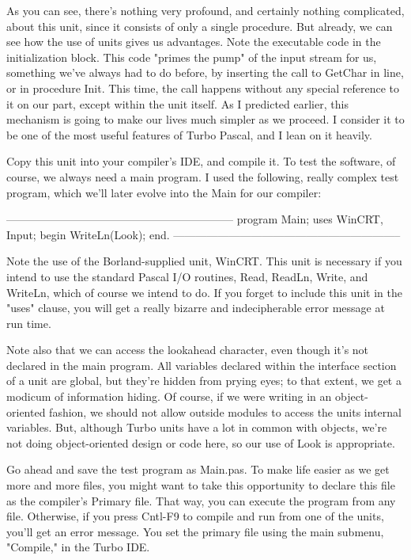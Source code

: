 \documentclass[float=false, crop=false]{standalone}
\begin{document}
As you can see, there's nothing very profound, and certainly nothing
complicated, about this unit, since it consists of only a single procedure. But
already, we can see how the use of units gives us advantages. Note the
executable code in the initialization block. This code "primes the pump" of the
input stream for us, something we've always had to do before, by inserting the
call to GetChar in line, or in procedure Init. This time, the call happens
without any special reference to it on our part, except within the unit itself.
As I predicted earlier, this mechanism is going to make our lives much simpler
as we proceed. I consider it to be one of the most useful features of Turbo
Pascal, and I lean on it heavily.

Copy this unit into your compiler's IDE, and compile it. To test the software,
of course, we always need a main program. I used the following, really complex
test program, which we'll later evolve into the Main for our compiler:

\begin{code}
{--------------------------------------------------------------}
program Main;
uses WinCRT, Input;
begin
	WriteLn(Look);
end.
{--------------------------------------------------------------}
\end{code}

Note the use of the Borland-supplied unit, WinCRT. This unit is necessary if you
intend to use the standard Pascal I/O routines, Read, ReadLn, Write, and
WriteLn, which of course we intend to do. If you forget to include this unit in
the "uses" clause, you will get a really bizarre and indecipherable error
message at run time.

Note also that we can access the lookahead character, even though it's not
declared in the main program. All variables declared within the interface
section of a unit are global, but they're hidden from prying eyes; to that
extent, we get a modicum of information hiding. Of course, if we were writing in
an object- oriented fashion, we should not allow outside modules to access the
units internal variables. But, although Turbo units have a lot in common with
objects, we're not doing object-oriented design or code here, so our use of Look
is appropriate.

Go ahead and save the test program as Main.pas. To make life easier as we get
more and more files, you might want to take this opportunity to declare this
file as the compiler's Primary file. That way, you can execute the program from
any file. Otherwise, if you press Cntl-F9 to compile and run from one of the
units, you'll get an error message. You set the primary file using the main
submenu, "Compile," in the Turbo IDE.
\end{document}
